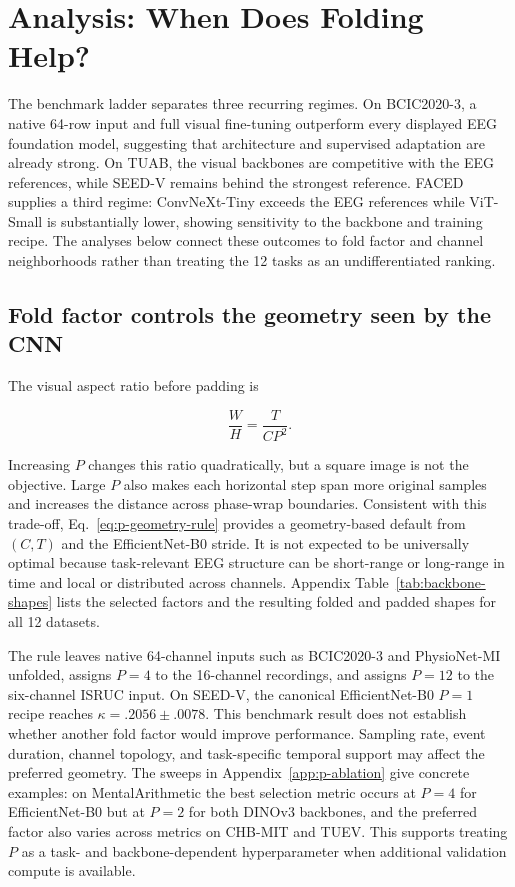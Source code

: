 \section{Analysis: When Does Folding Help?}
\label{sec:analysis}

The benchmark ladder separates three recurring regimes. On BCIC2020-3, a
native 64-row input and full visual fine-tuning outperform every displayed EEG
foundation model, suggesting that architecture and supervised adaptation are
already strong. On TUAB, the visual backbones are competitive with the EEG references, while SEED-V remains behind the strongest reference. FACED supplies a third regime: ConvNeXt-Tiny exceeds
the EEG references while ViT-Small is substantially lower, showing sensitivity
to the backbone and training recipe. The analyses below connect these outcomes to fold factor and channel
neighborhoods rather than treating the 12 tasks as an undifferentiated ranking.

\subsection{Fold factor controls the geometry seen by the CNN}

The visual aspect ratio before padding is

\begin{equation}
  \frac{W}{H}=\frac{T}{CP^2}.
\end{equation}

Increasing $P$ changes this ratio quadratically, but a square image is not the
objective.  Large $P$ also makes each horizontal step span more original
samples and increases the distance across phase-wrap boundaries.  Consistent
with this trade-off, Eq.~\ref{eq:p-geometry-rule} provides a geometry-based
default from $(C,T)$ and the EfficientNet-B0 stride. It is not expected to be
universally optimal because task-relevant EEG structure can be short-range or
long-range in time and local or distributed across channels. Appendix
Table~\ref{tab:backbone-shapes} lists the selected factors and the resulting
folded and padded shapes for all 12 datasets.

The rule leaves native 64-channel inputs such as BCIC2020-3 and PhysioNet-MI
unfolded, assigns $P=4$ to the 16-channel recordings, and assigns $P=12$ to
the six-channel ISRUC input. On SEED-V, the canonical EfficientNet-B0
$P=1$ recipe reaches $\kappa=.2056\pm.0078$. This benchmark result does not
establish whether another fold factor would improve performance. Sampling
rate, event duration, channel topology, and task-specific temporal support
may affect the preferred geometry. The sweeps in
Appendix~\ref{app:p-ablation} give concrete examples: on MentalArithmetic the
best selection metric occurs at $P=4$ for EfficientNet-B0 but at $P=2$ for both
DINOv3 backbones, and the preferred factor also varies across metrics on
CHB-MIT and TUEV. This supports treating $P$ as a task- and backbone-dependent
hyperparameter when additional validation compute is available.

